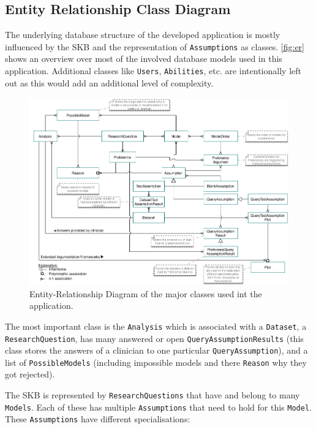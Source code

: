 \subsection{Entity Relationship Class Diagram }
\label{sub:db}


The underlying database structure of the developed application is mostly influenced by the \gls{SKB} and the representation of \texttt{Assumptions} as classes. \autoref{fig:er} shows an overview over most of the involved database models used in this application. Additional classes like \texttt{Users}, \texttt{Abilities}, etc. are intentionally left out as this would add an additional level of complexity. 

\begin{figure}[!h]
	\centering
	\includegraphics[width=\textwidth]{figures/er_complete}
	\caption{Entity-Relationship Diagram of the major classes used int the application. }
	\label{fig:er}
\end{figure}


The most important class is the \texttt{Analysis} which is associated with a \texttt{Dataset}, a \texttt{ResearchQuestion}, has many answered or open \texttt{QueryAssumptionResults} (this class stores the answers of a clinician to one particular \texttt{QueryAssumption}), and a list of \texttt{PossibleModels} (including impossible models and there \texttt{Reason} why they got rejected). 

The \gls{SKB} is represented by \texttt{ResearchQuestions} that have and belong to many \texttt{Models}. Each of these has multiple \texttt{Assumptions} that need to hold for this \texttt{Model}. These \texttt{Assumptions} have different specialisations: 


